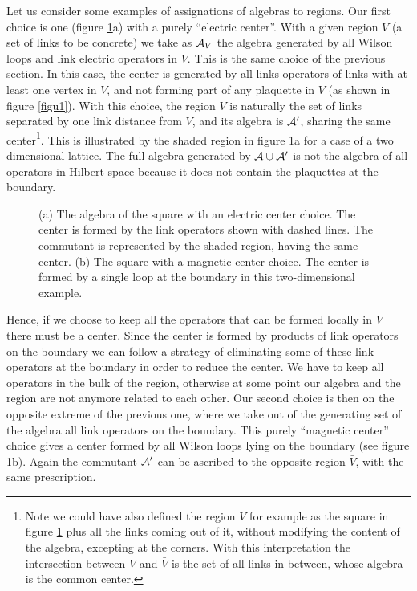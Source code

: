 \documentclass[12pt,a4paper]{article}
\begin{document}
Let us consider some examples of assignations of algebras to regions. Our first choice is one (figure \ref{figu2}a) with a purely ``electric center''.  
With a given region $V$ (a set of links to be concrete) we take as ${\cal A}_V$ the algebra generated by all Wilson loops and link electric 
operators in $V$. This is the same choice of the previous section. In this case, the center is generated by all links operators of links with at 
least one vertex in $V$, and not forming part of any plaquette in $V$ (as shown in figure \ref{figu1}). With this choice, the region $\bar{V}$ is naturally the set of links separated by 
one link distance from $V$, and its algebra is ${\cal A}^\prime$, sharing the same center\footnote{Note we could have also defined the region $V$ 
for example as the square in figure \ref{figu2} plus all the links coming out of it, without modifying the content of the algebra, excepting at 
the corners. With this interpretation the intersection between $V$ and $\bar{V}$ is the set of all links in between, whose algebra is the common 
center.}. This is illustrated by the shaded region in figure \ref{figu2}a for a case of a two dimensional lattice. The full algebra generated 
by ${\cal A}\cup {\cal A}^\prime$ is not the algebra of all operators in Hilbert space because it does not contain the plaquettes at the boundary.  


\begin{figure}
\centering
\leavevmode
\epsfysize=5cm
\bigskip
\caption{(a) The algebra of the square with an electric center choice. The center is formed by the link operators shown with dashed lines. 
The commutant is represented by the shaded region, having the same center. (b) The square with a magnetic center choice. The center is formed 
by a single loop at the boundary in this two-dimensional example.}
\label{figu2}
\end{figure}

Hence, if we choose to keep all the operators that can be formed locally in $V$ there must be a center. Since the center is formed by products 
of link operators on the boundary we can follow a strategy of eliminating some of these link operators at the boundary in order to reduce the center. We have to keep 
all operators in the bulk of the region, otherwise at some point our algebra and the region are not anymore related to each other. Our second 
choice is then on the opposite extreme of the previous one, where we take out of the generating set of the algebra all link operators on the 
boundary. This purely ``magnetic center'' choice gives a center formed by all Wilson loops lying on the boundary (see figure \ref{figu2}b). Again 
the commutant ${\cal A}^\prime$ can be ascribed to the opposite region $\bar{V}$, with the same prescription.     
\end{document}

